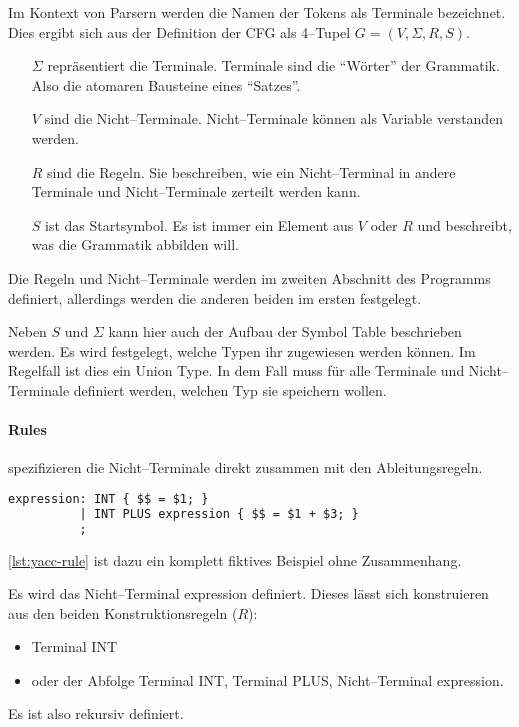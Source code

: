 Im Kontext von Parsern werden die Namen der Tokens als Terminale bezeichnet.
Dies ergibt sich aus der Definition der \ac{CFG} als 4--Tupel $G=(V,\Sigma,R,S)$.~\autocite{sipser-1997}
\begin{itemize}
    \item[$\Sigma$] repräsentiert die Terminale.
    Terminale sind die \enquote{Wörter} der Grammatik.
    Also die atomaren Bausteine eines \enquote{Satzes}.
    \item[$V$] sind die Nicht--Terminale.
    Nicht--Terminale können als Variable verstanden werden.
    \item[$R$] sind die Regeln.
    Sie beschreiben, wie ein Nicht--Terminal in andere Terminale und Nicht--Terminale zerteilt werden kann.
    \item[$S$] ist das Startsymbol.
    Es ist immer ein Element aus $V$ oder $R$ und beschreibt, was die Grammatik abbilden will.
\end{itemize}
Die Regeln und Nicht--Terminale werden im zweiten Abschnitt des Programms definiert, allerdings werden die anderen beiden im ersten festgelegt.

Neben $S$ und $\Sigma$ kann hier auch der Aufbau der Symbol Table beschrieben werden.
Es wird festgelegt, welche Typen ihr zugewiesen werden können.
Im Regelfall ist dies ein Union Type.
In dem Fall muss für alle Terminale und Nicht--Terminale definiert werden, welchen Typ sie speichern wollen.

\paragraph{Rules} spezifizieren die Nicht--Terminale direkt zusammen mit den Ableitungsregeln.
\begin{lstlisting}[label={lst:yacc-rule},caption={\acs{YACC} Regel},language=yacc]
expression: INT { $$ = $1; }
          | INT PLUS expression { $$ = $1 + $3; }
          ;
\end{lstlisting}
\autoref{lst:yacc-rule} ist dazu ein komplett fiktives Beispiel ohne Zusammenhang.

Es wird das Nicht--Terminal {\ttfamily expression} definiert.
Dieses lässt sich konstruieren aus den beiden Konstruktionsregeln ($R$):
\begin{itemize}
    \item Terminal {\ttfamily INT}
    \item oder der Abfolge Terminal {\ttfamily INT}, Terminal {\ttfamily PLUS}, Nicht--Terminal {\ttfamily expression}.
\end{itemize}
Es ist also rekursiv definiert.

